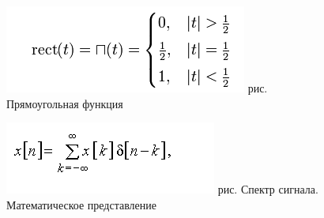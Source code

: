 \documentclass[10pt,a4paper]{report}
\begin{document}
\begin{figure}
\begin{center}
\includegraphics[angle=0, scale = 0.8]{19.png}\newline
рис.    Прямоугольная функция
\end{center}
\end{figure}
\begin{figure}
\begin{center}
\includegraphics[angle=0, scale = 0.8]{20.png}\newline
рис.    Спектр сигнала. Математическое представление \newline
\end{center}
\end{figure}
\end{document}
